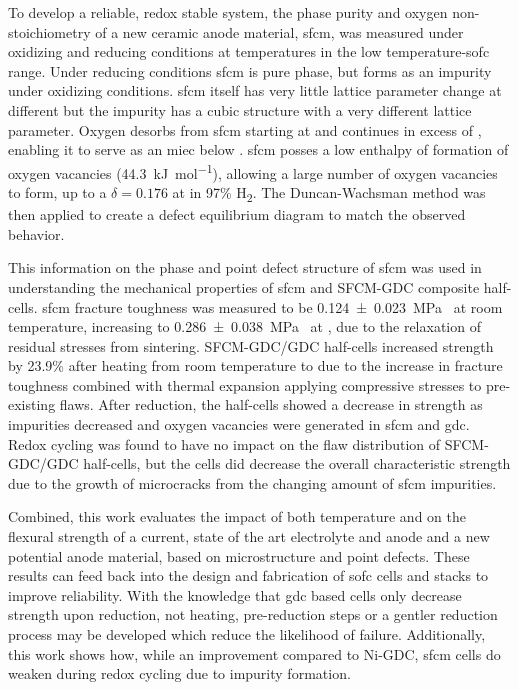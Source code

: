 To develop a reliable, redox stable system, the phase purity and oxygen non-stoichiometry of a new ceramic anode material, \gls{sfcm}, was measured under oxidizing and reducing conditions at temperatures in the low temperature-\gls{sofc} range.
Under reducing conditions \gls{sfcm} is pure phase, but forms  as an impurity under oxidizing conditions.
\Gls{sfcm} itself has very little lattice parameter change at different  but the impurity  has a cubic structure with a very different lattice parameter.
Oxygen desorbs from \Gls{sfcm} starting at  and continues in excess of , enabling it to serve as an \gls{miec} below .
\Gls{sfcm} posses a low enthalpy of formation of oxygen vacancies (\SI{44.3}{\kilo\joule\per\mol}), allowing a large number of oxygen vacancies to form, up to a $\delta = 0.176$ at  in 97\% H\textsubscript{2}.
The Duncan-Wachsman method was then applied to create a defect equilibrium diagram to match the observed behavior.

This information on the phase and point defect structure of \gls{sfcm} was used in understanding the mechanical properties of \gls{sfcm} and SFCM-GDC composite half-cells.
\Gls{sfcm} fracture toughness was measured to be \SI[separate-uncertainty = true]{0.124 +- 0.023}{\mega\pascal{}} at room temperature, increasing to \SI[separate-uncertainty = true]{0.286 +- 0.038}{\mega\pascal{}} at , due to the relaxation of residual stresses from sintering.
SFCM-GDC/GDC half-cells increased strength by 23.9\% after heating from room temperature to  due to the increase in fracture toughness combined with thermal expansion applying compressive stresses to pre-existing flaws.
After reduction, the half-cells showed a decrease in strength as impurities decreased and oxygen vacancies were generated in \gls{sfcm} and \gls{gdc}.
Redox cycling was found to have no impact on the flaw distribution of SFCM-GDC/GDC half-cells, but the cells did decrease the overall characteristic strength due to the growth of microcracks from the changing amount of \gls{sfcm} impurities.

Combined, this work evaluates the impact of both temperature and  on the flexural strength of a current, state of the art electrolyte and anode and a new potential anode material, based on microstructure and point defects.
These results can feed back into the design and fabrication of \gls{sofc} cells and stacks to improve reliability.
With the knowledge that \gls{gdc} based cells only decrease strength upon reduction, not heating, pre-reduction steps or a gentler reduction process may be developed which reduce the likelihood of failure.
Additionally, this work shows how, while an improvement compared to Ni-GDC, \gls{sfcm} cells do weaken during redox cycling due to impurity formation.

